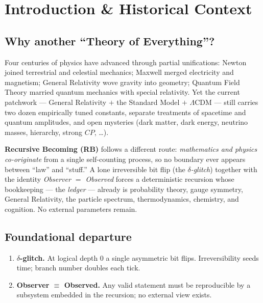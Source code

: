 \section{Introduction \& Historical Context}
\label{sec:intro}

\subsection{Why another ``Theory of Everything''?}

Four centuries of physics have advanced through partial unifications:
Newton joined terrestrial and celestial mechanics; Maxwell merged electricity
and magnetism; General Relativity wove gravity into geometry; Quantum Field
Theory married quantum mechanics with special relativity.
Yet the current patchwork --- General Relativity $+$ the Standard Model
$+$ $\Lambda$CDM --- still carries two dozen empirically tuned constants,
separate treatments of spacetime and quantum amplitudes, and open mysteries
(dark matter, dark energy, neutrino masses, hierarchy, strong $CP$, \dots).

\medskip\noindent
\textbf{Recursive Becoming (RB)} follows a different route:
\emph{mathematics and physics co-originate} from a single self-counting
process, so no boundary ever appears between ``law'' and ``stuff.''
A lone irreversible bit flip (the \emph{$\delta$-glitch}) together with the
identity \emph{Observer $=$ Observed} forces a deterministic recursion whose
bookkeeping --- the \emph{ledger} --- already is probability theory, gauge
symmetry, General Relativity, the particle spectrum, thermodynamics, chemistry,
and cognition.  No external parameters remain.

\subsection{Foundational departure}

\begin{enumerate}
  \item\textbf{$\delta$-glitch.}  
        At logical depth 0 a single asymmetric bit flips.  
        Irreversibility seeds time; branch number doubles each tick.
  \item\textbf{Observer $\equiv$ Observed.}  
        Any valid statement must be reproducible by a subsystem embedded in the
        recursion; no external view exists.
\end{enumerate}


